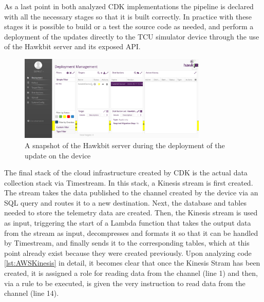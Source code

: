 As a last point in both analyzed CDK implementations the pipeline is declared with all the necessary stages so that it is built correctly. In practice with these stages it is possible to build or a test the source code as needed, and perform a deployment of the updates directly to the TCU simulator device through the use of the Hawkbit server and its exposed API.
\begin{figure}[h]  %
    \centering
    \includegraphics[width=0.8\textwidth]{images/hawkbit_server.png}  %
    \caption{A snapshot of the Hawkbit server during the deployment of the update on the device}
    \label{fig:HawkbitServer}
\end{figure}
The final stack of the cloud infrastructure created by CDK is the actual data collection stack via Timestream. In this stack, a Kinesis stream is first created. The stream takes the data published to the channel created by the device via an SQL query and routes it to a new destination. Next, the database and tables needed to store the telemetry data are created. Then, the Kinesis stream is used as input, triggering the start of a Lambda function that takes the output data from the stream as input, decompresses and formats it so that it can be handled by Timestream, and finally sends it to the corresponding tables, which at this point already exist because they were created previously.
Upon analyzing code \ref{lst:AWSKinesis} in detail, it becomes clear that once the Kinesis Stram has been created, it is assigned a role for reading data from the channel (line 1) and then, via a rule to be executed, is given the very instruction to read data from the channel (line 14).

